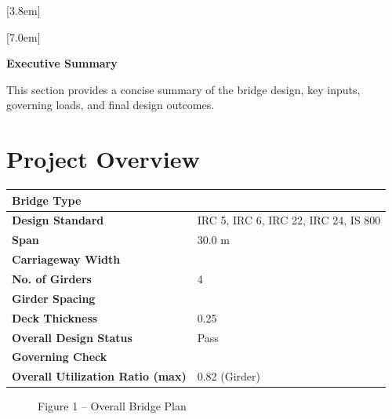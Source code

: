 \documentclass[12pt,a4paper]{report}
\numberwithin{table}{chapter}
\numberwithin{figure}{chapter}
\begin{document}
[3.8em]
  {\normalfont}
  {\contentslabel{2.3em}}
  {\hspace*{-2.3em}}
  {\hfill\contentspage}

[7.0em]
  {\normalfont}
  {\contentslabel{3.2em}}
  {\hspace*{-3.2em}}
  {\hfill\contentspage}

\newpage
\renewcommand{\contentsname}{\centering\Large\bfseries Table of Contents}
\tableofcontents


\newpage
{\centering\Large\bfseries Executive Summary\par}
\vspace{0.8em}

This section provides a concise summary of the bridge design, key inputs, governing loads, and final design outcomes.

\section*{Project Overview}
\label{sec:project-overview}


\begin{tabular}{|L{5.5cm}|L{8.5cm}|}
\hline
\textbf{Bridge Type} &  \\
\hline
\textbf{Design Standard} & IRC 5, IRC 6, IRC 22, IRC 24, IS 800 \\
\hline
\textbf{Span} & 30.0 m \\
\hline
\textbf{Carriageway Width} &  \\
\hline
\textbf{No. of Girders} & 4 \\
\hline
\textbf{Girder Spacing} &  \\
\hline
\textbf{Deck Thickness} & 0.25 \\
\hline
\textbf{Overall Design Status} & Pass \\
\hline
\textbf{Governing Check} &  \\
\hline
\textbf{Overall Utilization Ratio (max)} & 0.82 (Girder) \\
\hline
\end{tabular}


\begin{figure}[H]
\centering
{}
\caption*{Figure 1 -- Overall Bridge Plan}
\end{figure}

\newpage
\end{document}
